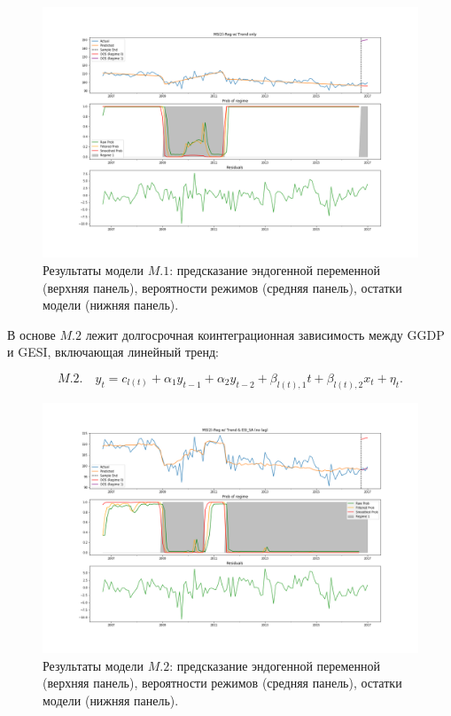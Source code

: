\documentclass[a4paper,14pt]{extreport}
\begin{document}
\begin{figure}[H]
	\includegraphics[width=\linewidth]{img/manual/model_m1.png}
	\caption{
		Результаты модели $M.1$: предсказание эндогенной переменной (верхняя панель), вероятности режимов (средняя панель), остатки модели (нижняя панель).
	}
	\label{fig:sm_model_m1}
\end{figure}

В основе $M.2$ лежит долгосрочная коинтеграционная зависимость между GGDP и GESI, включающая линейный тренд:

\begin{equation}
	M.2. \quad y_t = c_{l(t)} + \alpha_1 y_{t-1} + \alpha_2 y_{t-2} + \beta_{l(t), 1} t + \beta_{l(t), 2} x_{t} + \eta_t .
\end{equation}

\begin{figure}[H]
	\includegraphics[width=\linewidth]{img/manual/model_m2.png}
	\caption{
		Результаты модели $M.2$: предсказание эндогенной переменной (верхняя панель), вероятности режимов (средняя панель), остатки модели (нижняя панель).
	}
	\label{fig:sm_model_m2}
\end{figure}
\end{document}
